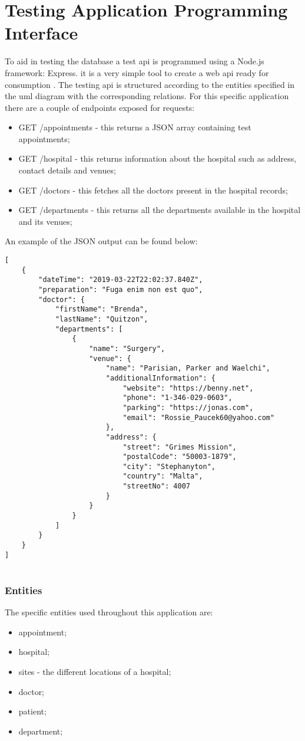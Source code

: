 \section{Testing Application Programming Interface}
To aid in testing the database a test \acrshort{api} is programmed using a Node.js framework: Express. it is a very simple tool to create a web \acrshort{api} ready for consumption \cite{Express2019}. The testing \acrshort{api} is structured according to the entities specified in the \acrshort{uml} diagram with the corresponding relations. For this specific application there are a couple of endpoints exposed for requests:
\begin{itemize}
\item GET /appointments - this returns a JSON array containing test appointments;
\item GET /hospital - this returns information about the hospital such as address, contact details and venues;
\item GET /doctors - this fetches all the doctors present in the hospital records;
\item GET /departments - this returns all the departments available in the hospital and its venues;
\end{itemize}
An example of the JSON output can be found below:
\begin{verbatim}
[
    {
        "dateTime": "2019-03-22T22:02:37.840Z",
        "preparation": "Fuga enim non est quo",
        "doctor": {
            "firstName": "Brenda",
            "lastName": "Quitzon",
            "departments": [
                {
                    "name": "Surgery",
                    "venue": {
                        "name": "Parisian, Parker and Waelchi",
                        "additionalInformation": {
                            "website": "https://benny.net",
                            "phone": "1-346-029-0603",
                            "parking": "https://jonas.com",
                            "email": "Rossie_Paucek60@yahoo.com"
                        },
                        "address": {
                            "street": "Grimes Mission",
                            "postalCode": "50003-1879",
                            "city": "Stephanyton",
                            "country": "Malta",
                            "streetNo": 4007
                        }
                    }
                }
            ]
        }
    }
]
       
\end{verbatim}
\subsubsection{Entities}
The specific entities used throughout this application are:
\begin{itemize}
\item appointment;
\item hospital;
\item sites - the different locations of a hospital;
\item doctor;
\item patient;
\item department;
\end{itemize}
